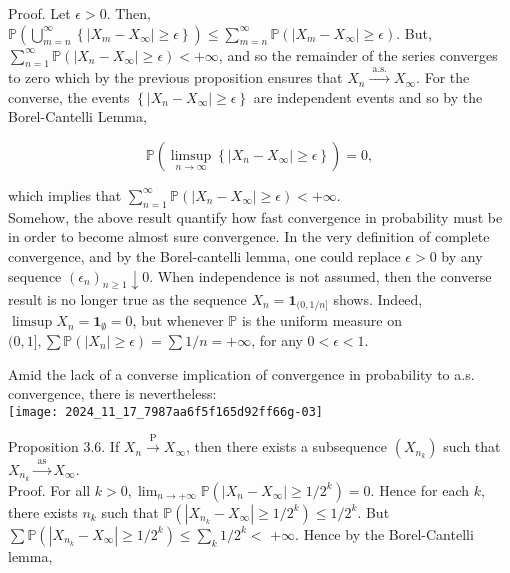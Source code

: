 \documentclass[11pt]{amsbook}
\theoremstyle{plain}%
\theoremstyle{definition}
\theoremstyle{remark}
\begin{document}
Proof. Let $\epsilon>0$. Then, $\mathbb{P}\left(\bigcup_{m=n}^{\infty}\left\{\left|X_{m}-X_{\infty}\right| \geq \epsilon\right\}\right) \leq \sum_{m=n}^{\infty} \mathbb{P}\left(\left|X_{m}-X_{\infty}\right| \geq \epsilon\right)$. But, $\sum_{n=1}^{\infty} \mathbb{P}\left(\left|X_{n}-X_{\infty}\right| \geq \epsilon\right)<+\infty$, and so the remainder of the series converges to zero which by the previous proposition ensures that $X_{n} \xrightarrow{\text { a.s. }} X_{\infty}$. For the converse, the events $\left\{\left|X_{n}-X_{\infty}\right| \geq \epsilon\right\}$ are independent events and so by the Borel-Cantelli Lemma,

$$
\mathbb{P}\left(\limsup _{n \rightarrow \infty}\left\{\left|X_{n}-X_{\infty}\right| \geq \epsilon\right\}\right)=0,
$$

which implies that $\sum_{n=1}^{\infty} \mathbb{P}\left(\left|X_{n}-X_{\infty}\right| \geq \epsilon\right)<+\infty$.\\
Somehow, the above result quantify how fast convergence in probability must be in order to become almost sure convergence. In the very definition of complete convergence, and by the Borel-cantelli lemma, one could replace $\epsilon>0$ by any sequence $\left(\epsilon_{n}\right)_{n \geq 1} \downarrow 0$. When independence is not assumed, then the converse result is no longer true as the sequence $X_{n}=\mathbf{1}_{(0,1 / n]}$ shows. Indeed, $\limsup X_{n}=\mathbf{1}_{\emptyset}=0$, but whenever $\mathbb{P}$ is the uniform measure on $(0,1], \sum \mathbb{P}\left(\left|X_{n}\right| \geq \epsilon\right)=\sum 1 / n=+\infty$, for any $0<\epsilon<1$.

Amid the lack of a converse implication of convergence in probability to a.s. convergence, there is nevertheless:\\
\texttt{[image: 2024\_11\_17\_7987aa6f5f165d92ff66g-03]}

Proposition 3.6. If $X_{n} \xrightarrow{\mathrm{P}} X_{\infty}$, then there exists a subsequence $\left(X_{n_{k}}\right)$ such that $X_{n_{k}} \xrightarrow{\text { as }} X_{\infty}$.\\
Proof. For all $k>0, \lim _{n \rightarrow+\infty} \mathbb{P}\left(\left|X_{n}-X_{\infty}\right| \geq 1 / 2^{k}\right)=0$. Hence for each $k$, there exists $n_{k}$ such that $\mathbb{P}\left(\left|X_{n_{k}}-X_{\infty}\right| \geq 1 / 2^{k}\right) \leq 1 / 2^{k}$. But $\sum \mathbb{P}\left(\left|X_{n_{k}}-X_{\infty}\right| \geq 1 / 2^{k}\right) \leq \sum_{k} 1 / 2^{k}<$ $+\infty$. Hence by the Borel-Cantelli lemma,
\end{document}
